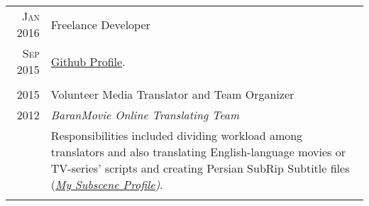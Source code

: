\documentclass[a4paper,10pt]{article}
\begin{document}
\begin{longtable}{r|p{14.70cm}}
    \textsc{Jan 2016} & Freelance Developer \\
    \textsc{Sep 2015} & \footnotesize{\href{https://github.com/anewage}{Github Profile}.}\\\multicolumn{2}{c}{} \\
    
    
    \textsc{2015} & Volunteer Media Translator and Team Organizer\\
    \textsc{2012} & \emph{BaranMovie Online Translating Team}\\
    & \footnotesize{Responsibilities included dividing workload among translators and also translating English-language movies or TV-series' scripts and creating Persian SubRip Subtitle files (\textit{\href{https://subscene.com/u/618697}{My Subscene Profile})}.}\\\multicolumn{2}{c}{} \\
 
\end{longtable}

\end{document}
